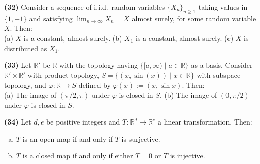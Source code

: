 \documentclass[11pt,a4paper]{article}
\newcommand{\R}{\mathbb{R}}
\newcommand{\qitem}[1]{\par\medskip\noindent\textbf{#1}\hspace{0.5em}}
\begin{document}
\qitem{(32)} Consider a sequence of i.i.d.\ random variables $\{X_n\}_{n \ge 1}$ taking values in $\{1, -1\}$ and satisfying $\lim_{n \to \infty} X_n = X$ almost surely, for some random variable $X$. Then:\\
(a) $X$ is a constant, almost surely. \qquad (b) $X_1$ is a constant, almost surely. \qquad (c) $X$ is distributed as $X_1$.

\qitem{(33)} Let $\R'$ be $\R$ with the topology having $\{[a, \infty) \mid a \in \R\}$ as a basis. Consider $\R' \times \R'$ with product topology, $S = \{(x, \sin(x)) \mid x \in \R\}$ with subspace topology, and $\varphi : \R \to S$ defined by $\varphi(x) := (x, \sin x)$. Then:\\
(a) The image of $(\pi/2, \pi)$ under $\varphi$ is closed in $S$. \qquad (b) The image of $(0, \pi/2)$ under $\varphi$ is closed in $S$.

\qitem{(34)} Let $d, e$ be positive integers and $T : \R^d \to \R^e$ a linear transformation. Then:
\begin{enumerate}[(a)]
  \item $T$ is an open map if and only if $T$ is surjective.
  \item $T$ is a closed map if and only if either $T = 0$ or $T$ is injective.
\end{enumerate}
\end{document}
